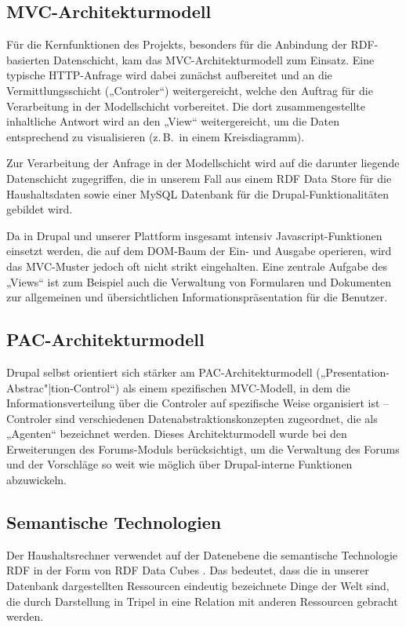 \documentclass[a4paper,11pt,twoside]{article}
\begin{document}
\subsection{MVC-Architekturmodell}

Für die Kernfunktionen des Projekts, besonders für die Anbindung der
RDF-basierten Datenschicht, kam das MVC-Architekturmodell \cite{MVC} zum
Einsatz.  Eine typische HTTP-Anfrage wird dabei zunächst aufbereitet und an die
Vermittlungsschicht („Controler“) weitergereicht, welche den Auftrag für die
Verarbeitung in der Modellschicht vorbereitet. Die dort zusammengestellte
inhaltliche Antwort wird an den „View“ weitergereicht, um die Daten
entsprechend zu visualisieren (z.\,B.\ in einem Kreisdiagramm).

Zur Verarbeitung der Anfrage in der Modellschicht wird auf die darunter
liegende Datenschicht zugegriffen, die in unserem Fall aus einem RDF Data
Store für die Haushaltsdaten sowie einer MySQL Datenbank für die
Drupal-Funktionalitäten gebildet wird. 

Da in Drupal und unserer Plattform insgesamt intensiv Javascript-Funktionen
einsetzt werden, die auf dem DOM-Baum der Ein- und Ausgabe operieren, wird das
MVC-Muster jedoch oft nicht strikt eingehalten. Eine zentrale Aufgabe des
„Views“ ist zum Beispiel auch die Verwaltung von Formularen und Dokumenten zur
allgemeinen und übersichtlichen Informationspräsentation für die Benutzer.

\subsection{PAC-Architekturmodell}

Drupal selbst orientiert sich stärker am PAC-Architekturmodell \cite{PAC}
(„Presentation-Abstrac"|tion-Control“) als einem spezifischen MVC-Modell, in dem
die Informationsverteilung über die Controler auf spezifische Weise organisiert
ist -- Controler sind verschiedenen Datenabstraktionskonzepten zugeordnet, die
als „Agenten“ bezeichnet werden.  Dieses Architekturmodell wurde bei den
Erweiterungen des Forums-Moduls berücksichtigt, um die Verwaltung des Forums
und der Vorschläge so weit wie möglich über Drupal-interne Funktionen
abzuwickeln.  

\subsection{Semantische Technologien}

Der Haushaltsrechner verwendet auf der Datenebene die semantische Technologie
RDF \cite{RDF} in der Form von RDF Data Cubes \cite{RDFCube}. Das bedeutet,
dass die in unserer Datenbank dargestellten Ressourcen eindeutig bezeichnete
Dinge der Welt sind, die durch Darstellung in Tripel in eine Relation mit
anderen Ressourcen gebracht werden.
\end{document}
